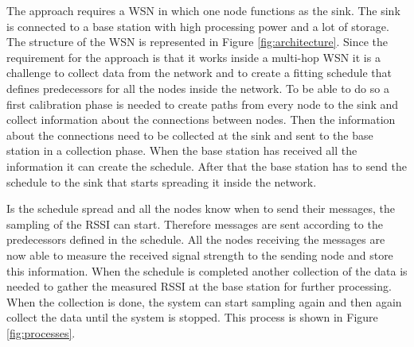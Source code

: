 The approach requires a WSN in which one node functions as the sink. The sink is connected to a base station with high processing power and a lot of storage. The structure of the WSN is represented in Figure \ref{fig:architecture}. Since the requirement for the approach is that it works inside a multi-hop WSN it is a challenge to collect data from the network and to create a fitting schedule that defines predecessors for all the nodes inside the network. To be able to do so a first calibration phase is needed to create paths from every node to the sink and collect information about the connections between nodes. Then the information about the connections need to be collected at the sink and sent to the base station in a collection phase. When the base station has received all the information it can create the schedule. After that the base station has to send the schedule to the sink that starts spreading it inside the network. 

Is the schedule spread and all the nodes know when to send their messages, the sampling of the RSSI can start. Therefore messages are sent according to the predecessors defined in the schedule. All the nodes receiving the messages are now able to measure the received signal strength to the sending node and store this information. When the schedule is completed another collection of the data is needed to gather the measured RSSI at the base station for further processing. When the collection is done, the system can start sampling again and then again collect the data until the system is stopped. This process is shown in Figure \ref{fig:processes}.    

